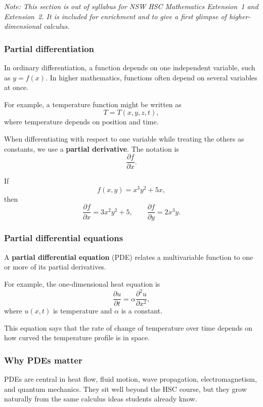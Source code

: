 \textit{Note: This section is out of syllabus for NSW HSC Mathematics Extension~1 and Extension~2. It is included for enrichment and to give a first glimpse of higher-dimensional calculus.}

\subsubsection*{Partial differentiation}
In ordinary differentiation, a function depends on one independent variable, such as $y=f(x)$. In higher mathematics, functions often depend on several variables at once.

For example, a temperature function might be written as
\[
T=T(x,y,z,t),
\]
where temperature depends on position and time.

When differentiating with respect to one variable while treating the others as constants, we use a \textbf{partial derivative}. The notation is
\[
\frac{\partial f}{\partial x}.
\]

If
\[
f(x,y)=x^3y^2+5x,
\]
then
\[
\frac{\partial f}{\partial x}=3x^2y^2+5,
\qquad
\frac{\partial f}{\partial y}=2x^3y.
\]

\subsubsection*{Partial differential equations}
A \textbf{partial differential equation} (PDE) relates a multivariable function to one or more of its partial derivatives.

For example, the one-dimensional heat equation is
\[
\frac{\partial u}{\partial t}=\alpha \frac{\partial^2u}{\partial x^2},
\]
where $u(x,t)$ is temperature and $\alpha$ is a constant.

This equation says that the rate of change of temperature over time depends on how curved the temperature profile is in space.

\subsubsection*{Why PDEs matter}
PDEs are central in heat flow, fluid motion, wave propagation, electromagnetism, and quantum mechanics. They sit well beyond the HSC course, but they grow naturally from the same calculus ideas students already know.
